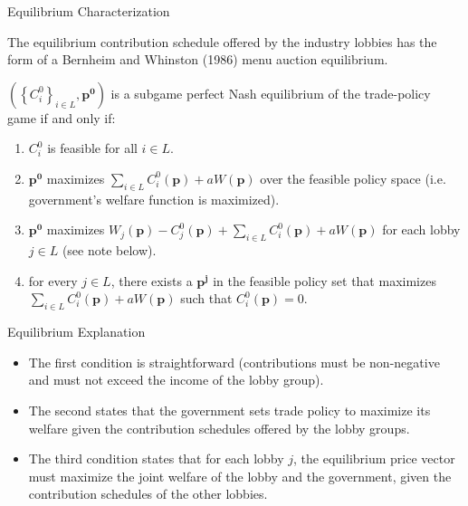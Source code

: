 \documentclass[aspectratio=169]{beamer}
\begin{document}
\begin{frame}{Equilibrium Characterization}

The equilibrium contribution schedule offered by the industry lobbies has the form of a Bernheim and Whinston (1986) menu auction equilibrium.
\begin{theorem}
    $ \left( \left\{ C_{i}^{0} \right\}_{i \in L}, \mathbf{p^{0}} \right) $ is a subgame perfect Nash equilibrium of the trade-policy game if and only if:
    \begin{enumerate}
        \item $ C_{i}^{0} $ is feasible for all $ i \in L $.
        \item $ \mathbf{p^{0}} $ maximizes $ \sum_{i \in L} C_{i}^{0}\left( \mathbf{p} \right) + a W\left( \mathbf{p} \right) $ over the feasible policy space (i.e. government's welfare function is maximized).
        \item $ \mathbf{p^{0}} $ maximizes $ W_{j}\left( \mathbf{p} \right) - C_{j}^{0}\left( \mathbf{p} \right) + \sum_{i \in L} C_{i}^{0}\left( \mathbf{p} \right) + a W\left( \mathbf{p} \right) $ for each lobby $ j \in L $ (see note below).
        \item for every $ j \in L $, there exists a $ \mathbf{p^{j}} $ in the feasible policy set that maximizes $ \sum_{i \in L} C_{i}^{0}\left( \mathbf{p} \right) + a W\left( \mathbf{p} \right) $ such that $ C_{i}^{0}\left( \mathbf{p} \right) = 0 $.
    \end{enumerate}
\end{theorem}
    
\end{frame}


\begin{frame}{Equilibrium Explanation}

\begin{itemize}
    \item<1-> The first condition is straightforward (contributions must be non-negative and must not exceed the income of the lobby group).
    \item<2-> The second states that the government sets trade policy to maximize its welfare given the contribution schedules offered by the lobby groups.
    \item<3-> The third condition states that for each lobby $ j $, the equilibrium price vector must maximize the joint welfare of the lobby and the government, given the contribution schedules of the other lobbies.
\end{itemize}
    
\end{frame}
\end{document}
